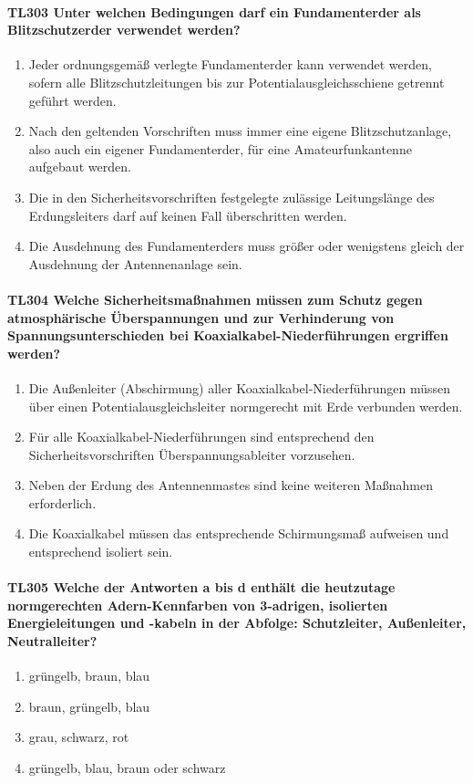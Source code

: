 \documentclass[8pt]{article}
\begin{document}
\paragraph*{TL303 Unter welchen Bedingungen darf ein Fundamenterder als Blitzschutzerder verwendet werden?}
\begin{enumerate}[nolistsep,label=\Alph*]
\item Jeder ordnungsgemäß verlegte Fundamenterder kann verwendet werden, sofern alle Blitzschutzleitungen bis zur Potentialausgleichsschiene getrennt geführt werden.
\item Nach den geltenden Vorschriften muss immer eine eigene Blitzschutzanlage, also auch ein eigener Fundamenterder, für eine Amateurfunkantenne aufgebaut werden.
\item Die in den Sicherheitsvorschriften festgelegte zulässige Leitungslänge des Erdungsleiters darf auf keinen Fall überschritten werden.
\item Die Ausdehnung des Fundamenterders muss größer oder wenigstens gleich der Ausdehnung der Antennenanlage sein.
\end{enumerate}

\paragraph*{TL304 Welche Sicherheitsmaßnahmen müssen zum Schutz gegen atmosphärische Überspannungen und zur Verhinderung von Spannungsunterschieden bei Koaxialkabel-Niederführungen ergriffen werden?}
\begin{enumerate}[nolistsep,label=\Alph*]
\item Die Außenleiter (Abschirmung) aller Koaxialkabel-Niederführungen müssen über einen Potentialausgleichsleiter normgerecht mit Erde verbunden werden.
\item Für alle Koaxialkabel-Niederführungen sind entsprechend den Sicherheitsvorschriften Überspannungsableiter vorzusehen.
\item Neben der Erdung des Antennenmastes sind keine weiteren Maßnahmen erforderlich.
\item Die Koaxialkabel müssen das entsprechende Schirmungsmaß aufweisen und entsprechend isoliert sein.
\end{enumerate}

\paragraph*{TL305 Welche der Antworten a bis d enthält die heutzutage normgerechten Adern-Kennfarben von 3-adrigen, isolierten Energieleitungen und -kabeln in der Abfolge: Schutzleiter, Außenleiter, Neutralleiter?}
\begin{enumerate}[nolistsep,label=\Alph*]
\item grüngelb, braun, blau
\item braun, grüngelb, blau
\item grau, schwarz, rot
\item grüngelb, blau, braun oder schwarz
\end{enumerate}
\end{document}
